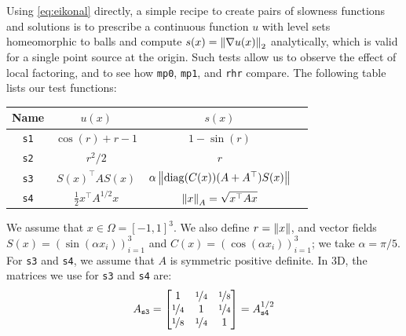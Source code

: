 \documentclass[sisc-eikonal.tex]{subfiles}
\begin{document}
Using \cref{eq:eikonal} directly, a simple recipe to create pairs of
slowness functions and solutions is to prescribe a continuous function
$u$ with level sets homeomorphic to balls and compute
$s(x) = \left\|\nabla u(x)\right\|_2$ analytically, which is valid for a
single point source at the origin. Such tests allow us to observe the
effect of local factoring, and to see how \texttt{mp0}, \texttt{mp1},
and \texttt{rhr} compare. The following table lists our test
functions: \vspace{0.5em}
\begin{center}
  \begin{tabular}{cccc}
    Name & $u(x)$ & $s(x)$ \\
    \midrule
    \texttt{s1} & $\cos(r) + r - 1$ & $1 - \sin(r)$ \\
    \texttt{s2} & $r^2/2$ & $r$ \\
    \texttt{s3} & $S(x)^\top A S(x)$ & $\alpha\left\|\operatorname{diag}(C(x)){(A + A^\top)}S(x)\right\|$ \\
    \texttt{s4} & $\tfrac{1}{2} x^\top A^{1/2} x$ & $\left\|x\right\|_A = \sqrt{x^\top A x}$
  \end{tabular}
\end{center}
\vspace{0.5em} We assume that $x \in \Omega = [-1, 1]^3$. We also
define $r = \left\|x\right\|$, and vector fields
$S(x) = (\sin(\alpha x_i))_{i=1}^3$ and
$C(x) = (\cos(\alpha x_i))_{i=1}^3$; we take $\alpha = \pi/5$. For
\texttt{s3} and \texttt{s4}, we assume that $A$ is symmetric positive
definite. In 3D, the matrices we use for \texttt{s3} and \texttt{s4}
are:\begin{equation} A_{\texttt{s3}} = \begin{bmatrix}
    1 & \nicefrac{1}{4} & \nicefrac{1}{8} \\
    \nicefrac{1}{4} & 1 & \nicefrac{1}{4} \\
    \nicefrac{1}{8} & \nicefrac{1}{4} & 1
  \end{bmatrix} = A_{\texttt{s4}}^{1/2}
\end{equation}
\end{document}
